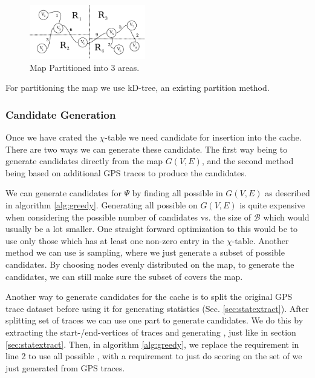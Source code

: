 \begin{figure}[bht]
  \center
        \includegraphics[width=0.45\textwidth]{figures/mappartition}
        \caption{Map Partitioned into 3 areas.}
  \label{fig:fillcache}
\end{figure}

For partitioning the map we use kD-tree, an existing partition method.




\subsubsection{Candidate Generation}

Once we have crated the $\chi$-table we need candidate \spaths for insertion into the cache. There are two ways we can generate these candidate. The first way being to generate candidates directly from the map $G(V,E)$, and the second method being based on additional GPS traces to produce the candidates.

We can generate candidates for $\Psi$ by finding all possible \spath in $G(V,E)$ as described in algorithm \ref{alg:greedy}. Generating all \spath possible on $G(V,E)$ is quite expensive when considering the possible number of candidates vs. the size of $\mathcal{B}$ which would usually be a lot smaller. One straight forward optimization to this would be to use only those \spath which has at least one non-zero entry in the $\chi$-table. Another method we can use is sampling, where we just generate a subset of possible candidates. By choosing nodes evenly distributed on the map, to generate the candidates, we can still make sure the subset of \spaths covers the map.

Another way to generate candidates for the cache is to split the original GPS trace dataset before using it for generating statistics (Sec. \ref{sec:statextract}). 
After splitting set of traces we can use one part to generate candidates. We do this by extracting the start-/end-vertices of traces and generating \spaths, just like in section \ref{sec:statextract}. Then, in algorithm \ref{alg:greedy}, we replace the requirement in line 2 to use all possible \spathsns, with a requirement to just do scoring on the set of \spaths we just generated from GPS traces.

